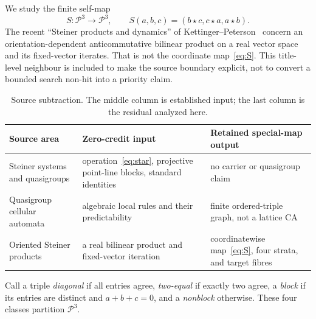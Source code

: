 \documentclass[a4paper,10pt]{amsart}
\theoremstyle{remark}
\newcommand{\cP}{\mathcal P}
\begin{document}
We study the finite self-map
\begin{equation}\label{eq:S}
 S:\cP^3\longrightarrow\cP^3,
 \qquad S(a,b,c)=(b\star c,c\star a,a\star b).
\end{equation}
The recent ``Steiner products and dynamics'' of
Kettinger--Peterson~\cite{KettingerPeterson2025} concern an
orientation-dependent anticommutative bilinear product on a real vector space
and its fixed-vector iterates.  That is not the coordinate map~\eqref{eq:S}.
This title-level neighbour is included to make the source boundary explicit,
not to convert a bounded search non-hit into a priority claim.

\begin{table}[ht]
\centering
\small
\caption{Source subtraction.  The middle column is established input; the
last column is the residual analyzed here.}
\label{tab:subtraction}
\begin{tabular}{@{}>{\raggedright\arraybackslash}p{}
                    >{\raggedright\arraybackslash}p{}
                    >{\raggedright\arraybackslash}p{}@{}}
\toprule
Source area & Zero-credit input & Retained special-map output \\
\midrule
Steiner systems and quasigroups
& operation~\eqref{eq:star}, projective point-line blocks, standard identities
& no carrier or quasigroup claim \\
Quasigroup cellular automata
& algebraic local rules and their predictability
& finite ordered-triple graph, not a lattice CA \\
Oriented Steiner products
& a real bilinear product and fixed-vector iteration
& coordinatewise map~\eqref{eq:S}, four strata, and target fibres \\
\bottomrule
\end{tabular}
\end{table}

Call a triple \emph{diagonal} if all entries agree, \emph{two-equal} if
exactly two agree, a \emph{block} if its entries are distinct and
$a+b+c=0$, and a \emph{nonblock} otherwise.  These four classes partition
$\cP^3$.
\end{document}
